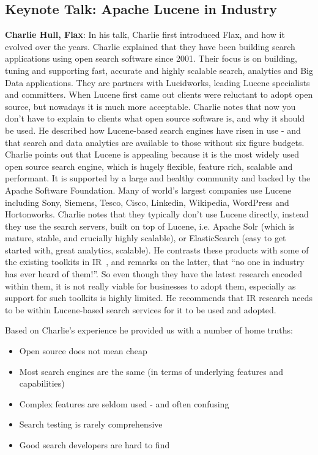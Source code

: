 \subsection*{Keynote Talk: Apache Lucene in Industry} 
{\bf Charlie Hull, Flax}: In his talk, Charlie first introduced Flax, and how it evolved over the years. Charlie explained that they have been building search applications using open search software since 2001. Their focus is on building, tuning and supporting fast, accurate and highly scalable search, analytics and Big Data applications. They are partners with Lucidworks, leading Lucene specialists and committers. When Lucene first came out clients were reluctant to adopt open source, but nowadays it is much more acceptable. Charlie notes that now you don't have to explain to clients what open source software is, and why it should be used. He described how Lucene-based search engines have risen in use - and that search and data analytics are available to those without six figure budgets. Charlie points out that Lucene is appealing because it is the most widely used open source search engine, which is hugely flexible, feature rich, scalable and performant. It is supported by a large and healthy community and backed by the Apache Software Foundation. Many of world's largest companies use Lucene including Sony, Siemens, Tesco, Cisco, Linkedin, Wikipedia, WordPress and Hortonworks. Charlie notes that they typically don't use Lucene directly, instead they use the search servers, built on top of Lucene, i.e. Apache Solr (which is mature, stable, and crucially highly scalable), or ElasticSearch (easy to get started with, great analytics, scalable). He contrasts these products with some of the existing toolkits in IR~\cite{Dowie2013,macdonald2012puppy,ogilvie2001experiments,zobel2004zettair}, and remarks on the latter, that ``no one in industry has ever heard of them!''. So even though they have the latest research encoded within them, it is not really viable for businesses to adopt them, especially as support for such toolkits is highly limited. He recommends that IR research needs to be within Lucene-based search services for it to be used and adopted. 


Based on Charlie's experience he provided us with a number of home truths:
\begin{itemize}
	\item Open source does not mean cheap 
	\item Most search engines are the same (in terms of underlying features and capabilities)
	\item Complex features are seldom used - and often confusing
	\item Search testing is rarely comprehensive
	\item Good search developers are hard to find
\end{itemize}



